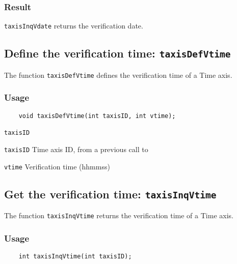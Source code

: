 \subsubsection*{Result}

{\texttt{taxisInqVdate}} returns the verification date.



\subsection{Define the verification time: \texttt{taxisDefVtime}}
\label{taxisDefVtime}

The function {\texttt{taxisDefVtime}} defines the verification time of a Time axis.

\subsubsection*{Usage}

\begin{verbatim}
    void taxisDefVtime(int taxisID, int vtime);
\end{verbatim}

\hspace*{4mm}\begin{minipage}[]{15cm}
\begin{deflist}{\texttt{taxisID}\ }
\item[\texttt{taxisID}]
Time axis ID, from a previous call to {}
\item[\texttt{vtime}]
Verification time (hhmmss)

\end{deflist}
\end{minipage}


\subsection{Get the verification time: \texttt{taxisInqVtime}}
\label{taxisInqVtime}

The function {\texttt{taxisInqVtime}} returns the verification time of a Time axis.

\subsubsection*{Usage}

\begin{verbatim}
    int taxisInqVtime(int taxisID);
\end{verbatim}

